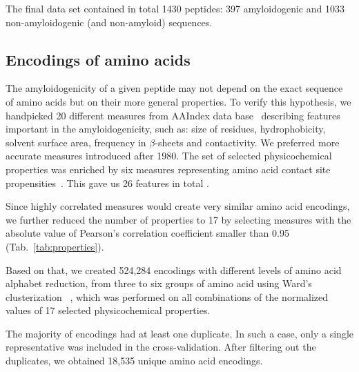 \documentclass[fleqn,10pt,twoside]{gcb15submission}
\begin{document}
  The final data set contained in total 1430 peptides: 397 amyloidogenic 
%
%
%
%
%
and 1033 non-amyloidogenic (and non-amyloid) sequences. 

\subsection{Encodings of amino acids}

The amyloidogenicity of a given peptide may not depend on the exact sequence of 
amino acids but on their more general properties. To verify this hypothesis, we 
handpicked 20 different measures from AAIndex data base~\citep{kawashima_aaindex:_2008} 
describing features important in the amyloidogenicity, such as: size of 
residues, hydrophobicity, solvent surface area, frequency in $\beta$-sheets and 
contactivity. We preferred more accurate measures introduced after 1980. 
The set of selected physicochemical properties was enriched by 
six measures representing amino acid contact site 
propensities~\cite{wozniak_characteristics_2014}. This gave us  26 features in total .

  Since highly correlated measures would create very similar amino acid 
encodings, we further reduced the number of properties to 17 by selecting 
measures with the absolute value of Pearson's correlation coefficient smaller 
than 0.95 (Tab.~\ref{tab:properties}). 

  Based on that, we created 524,284 encodings with different levels of 
amino acid alphabet reduction, from three to six groups of amino acid  using Ward's 
clusterization ~\citep{joe_h._ward_jr_hierarchical_1963},  which was performed 
on all combinations of the normalized values of 17 selected physicochemical properties.

  The majority of encodings had at least one duplicate. In such a case, only a 
single representative was included in the cross-validation. After filtering out the 
duplicates, we obtained 18,535 unique amino acid encodings.
\end{document}

